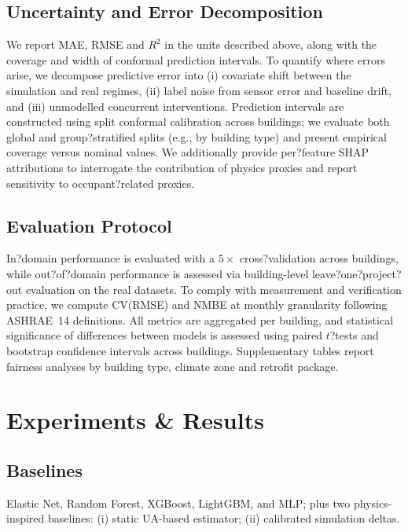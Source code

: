 ﻿\documentclass{article}
\begin{document}
\subsection{Uncertainty and Error Decomposition}
We report MAE, RMSE and $R^2$ in the units described above, along with the coverage and width of conformal prediction intervals.
To quantify where errors arise, we decompose predictive error into (i) covariate shift between the simulation and real regimes, (ii) label noise from sensor error and baseline drift, and (iii) unmodelled concurrent interventions.
Prediction intervals are constructed using split conformal calibration across buildings;
we evaluate both global and group?stratified splits (e.g., by building type) and present empirical coverage versus nominal values.
We additionally provide per?feature SHAP attributions to interrogate the contribution of physics proxies and report sensitivity to occupant?related proxies.

\subsection{Evaluation Protocol}
In?domain performance is evaluated with a $5\times$ cross?validation across buildings, while out?of?domain performance is assessed via building-level leave?one?project?out evaluation on the real datasets.
To comply with measurement and verification practice, we compute CV(RMSE) and NMBE at monthly granularity following ASHRAE~14 definitions.
All metrics are aggregated per building, and statistical significance of differences between models is assessed using paired $t$?tests and bootstrap confidence intervals across buildings.
Supplementary tables report fairness analyses by building type, climate zone and retrofit package.

\section{Experiments \& Results}
\subsection{Baselines}
Elastic Net, Random Forest, XGBoost, LightGBM, and MLP; plus two physics-inspired baselines: (i) static UA-based estimator;
(ii) calibrated simulation deltas.
\end{document}
